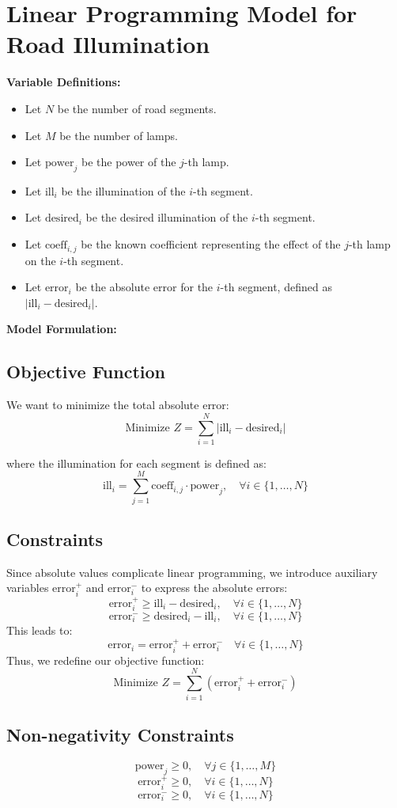 \documentclass{article}
\begin{document}
\section*{Linear Programming Model for Road Illumination}

\textbf{Variable Definitions:}
\begin{itemize}
    \item Let \( N \) be the number of road segments.
    \item Let \( M \) be the number of lamps.
    \item Let \( \text{power}_j \) be the power of the \( j \)-th lamp.
    \item Let \( \text{ill}_i \) be the illumination of the \( i \)-th segment.
    \item Let \( \text{desired}_i \) be the desired illumination of the \( i \)-th segment.
    \item Let \( \text{coeff}_{i,j} \) be the known coefficient representing the effect of the \( j \)-th lamp on the \( i \)-th segment.
    \item Let \( \text{error}_i \) be the absolute error for the \( i \)-th segment, defined as \( |\text{ill}_i - \text{desired}_i| \).
\end{itemize}

\textbf{Model Formulation:}

\subsection*{Objective Function}
We want to minimize the total absolute error:
\[
\text{Minimize } Z = \sum_{i=1}^{N} |\text{ill}_i - \text{desired}_i|
\]

where the illumination for each segment is defined as:
\[
\text{ill}_i = \sum_{j=1}^{M} \text{coeff}_{i,j} \cdot \text{power}_j, \quad \forall i \in \{1, \ldots, N\}
\]

\subsection*{Constraints}
Since absolute values complicate linear programming, we introduce auxiliary variables \( \text{error}_i^+ \) and \( \text{error}_i^- \) to express the absolute errors:
\[
\text{error}_i^+ \geq \text{ill}_i - \text{desired}_i, \quad \forall i \in \{1, \ldots, N\} 
\]
\[
\text{error}_i^- \geq \text{desired}_i - \text{ill}_i, \quad \forall i \in \{1, \ldots, N\}
\]
This leads to:
\[
\text{error}_i = \text{error}_i^+ + \text{error}_i^- \quad \forall i \in \{1, \ldots, N\}
\]
Thus, we redefine our objective function:
\[
\text{Minimize } Z = \sum_{i=1}^{N} (\text{error}_i^+ + \text{error}_i^-)
\]

\subsection*{Non-negativity Constraints}
\[
\text{power}_j \geq 0, \quad \forall j \in \{1, \ldots, M\}
\]
\[
\text{error}_i^+ \geq 0, \quad \forall i \in \{1, \ldots, N\}
\]
\[
\text{error}_i^- \geq 0, \quad \forall i \in \{1, \ldots, N\}
\]
\end{document}
